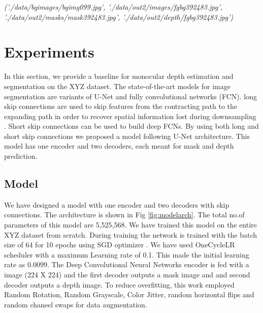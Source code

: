 \documentclass{article}
\begin{document}
\textit{('./data/bgimages/bgimg099.jpg', 
'./data/out2/images/fgbg392483.jpg', 
'./data/out2/masks/mask392483.jpg', 
'./data/out2/depth/fgbg392483.jpg')}

\section{Experiments}
In this section, we provide a baseline for monocular depth estimation and segmentation on the XYZ dataset. 
The state-of-the-art models for image segmentation are variants of U-Net and fully convolutional networks (FCN)\cite{drozdzal2016importance}. long skip connections are used to skip features from the contracting path to the expanding path in order to recover spatial information lost during downsampling \cite{zhou2019unet++}. Short skip connections can be used to build deep FCNs. By using both long and short skip connections we proposed a model following U-Net architecture. This model has one encoder and two decoders, each meant for mask and depth prediction.
\subsection{Model}
We have designed a model with one encoder and two decoders with skip connections. The architecture is shown in Fig \ref{fig:modelarch}. The total no.of parameters of this model are 5,525,568. We have trained this model on the entire XYZ dataset from scratch. During training the network is trained with the batch size of 64 for 10 epochs using SGD optimizer \cite{bottou2010large}. We have used OneCycleLR scheduler \cite{smith2018disciplined} with a maximum Learning rate of 0.1. This made the initial learning rate as 0.0099. The Deep Convolutional Neural Networks encoder is fed with a image (224 X 224) and the first decoder outputs a mask image and and second decoder outputs a depth image. To reduce overfitting\cite{perez2017effectiveness}, this work employed Random Rotation, Random Grayscale, Color Jitter, random horizontal flips and random chaneel swaps for data augmentation.
\end{document}
